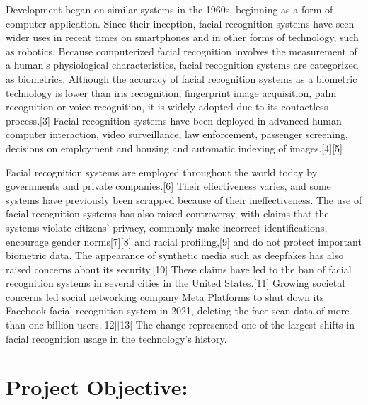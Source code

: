 Development began on similar systems in the 1960s, beginning as a form of computer application. Since their inception, facial recognition systems have seen wider uses in recent times on smartphones and in other forms of technology, such as robotics. Because computerized facial recognition involves the measurement of a human's physiological characteristics, facial recognition systems are categorized as biometrics. Although the accuracy of facial recognition systems as a biometric technology is lower than iris recognition, fingerprint image acquisition, palm recognition or voice recognition, it is widely adopted due to its contactless process.[3] Facial recognition systems have been deployed in advanced human–computer interaction, video surveillance, law enforcement, passenger screening, decisions on employment and housing and automatic indexing of images.[4][5]

Facial recognition systems are employed throughout the world today by governments and private companies.[6] Their effectiveness varies, and some systems have previously been scrapped because of their ineffectiveness. The use of facial recognition systems has also raised controversy, with claims that the systems violate citizens' privacy, commonly make incorrect identifications, encourage gender norms[7][8] and racial profiling,[9] and do not protect important biometric data. The appearance of synthetic media such as deepfakes has also raised concerns about its security.[10] These claims have led to the ban of facial recognition systems in several cities in the United States.[11] Growing societal concerns led social networking company Meta Platforms to shut down its Facebook facial recognition system in 2021, deleting the face scan data of more than one billion users.[12][13] The change represented one of the largest shifts in facial recognition usage in the technology's history.
\newpage
\section{Project Objective: }

